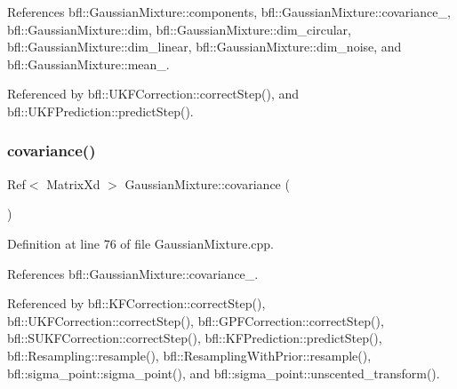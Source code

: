 References bfl\+::\+Gaussian\+Mixture\+::components, bfl\+::\+Gaussian\+Mixture\+::covariance\+\_\+, bfl\+::\+Gaussian\+Mixture\+::dim, bfl\+::\+Gaussian\+Mixture\+::dim\+\_\+circular, bfl\+::\+Gaussian\+Mixture\+::dim\+\_\+linear, bfl\+::\+Gaussian\+Mixture\+::dim\+\_\+noise, and bfl\+::\+Gaussian\+Mixture\+::mean\+\_\+.



Referenced by bfl\+::\+U\+K\+F\+Correction\+::correct\+Step(), and bfl\+::\+U\+K\+F\+Prediction\+::predict\+Step().

\mbox{\label{classbfl_1_1GaussianMixture_a65a60ef46d16ac33196a09963bbccdee}} 
\subsubsection{\texorpdfstring{covariance()}{covariance()}\hspace{0.1cm}{\footnotesize\ttfamily [1/6]}}
{\footnotesize\ttfamily Ref$<$ Matrix\+Xd $>$ Gaussian\+Mixture\+::covariance (\begin{DoxyParamCaption}{ }\end{DoxyParamCaption})\hspace{0.3cm}{\ttfamily [inherited]}}



Definition at line 76 of file Gaussian\+Mixture.\+cpp.



References bfl\+::\+Gaussian\+Mixture\+::covariance\+\_\+.



Referenced by bfl\+::\+K\+F\+Correction\+::correct\+Step(), bfl\+::\+U\+K\+F\+Correction\+::correct\+Step(), bfl\+::\+G\+P\+F\+Correction\+::correct\+Step(), bfl\+::\+S\+U\+K\+F\+Correction\+::correct\+Step(), bfl\+::\+K\+F\+Prediction\+::predict\+Step(), bfl\+::\+Resampling\+::resample(), bfl\+::\+Resampling\+With\+Prior\+::resample(), bfl\+::sigma\+\_\+point\+::sigma\+\_\+point(), and bfl\+::sigma\+\_\+point\+::unscented\+\_\+transform().

\mbox{\label{classbfl_1_1GaussianMixture_a80a6fa7d9edfc95103236378b4da3f7f}} 
